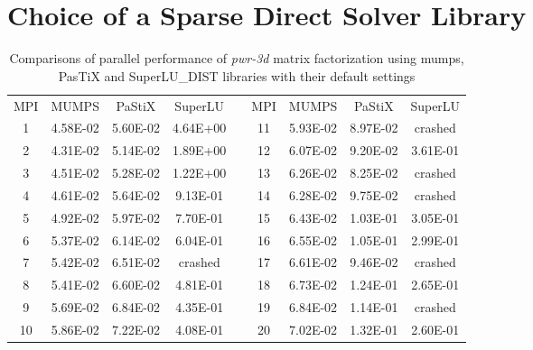 \chapter{Choice of a Sparse Direct Solver Library}
\label{app:app-lc}

\begin{table}[ht]
\centering
\begin{tabular}{|c|c|c|c|l|c|c|c|c|}
\cline{1-4} \cline{6-9}
MPI & MUMPS    & PaStiX   & SuperLU  &  & MPI & MUMPS    & PaStiX   & SuperLU  \\ \cline{1-4} \cline{6-9} 
1   & 4.58E-02 & 5.60E-02 & 4.64E+00 &  & 11  & 5.93E-02 & 8.97E-02 & crashed  \\ \cline{1-4} \cline{6-9} 
2   & 4.31E-02 & 5.14E-02 & 1.89E+00 &  & 12  & 6.07E-02 & 9.20E-02 & 3.61E-01 \\ \cline{1-4} \cline{6-9} 
3   & 4.51E-02 & 5.28E-02 & 1.22E+00 &  & 13  & 6.26E-02 & 8.25E-02 & crashed  \\ \cline{1-4} \cline{6-9} 
4   & 4.61E-02 & 5.64E-02 & 9.13E-01 &  & 14  & 6.28E-02 & 9.75E-02 & crashed  \\ \cline{1-4} \cline{6-9} 
5   & 4.92E-02 & 5.97E-02 & 7.70E-01 &  & 15  & 6.43E-02 & 1.03E-01 & 3.05E-01 \\ \cline{1-4} \cline{6-9} 
6   & 5.37E-02 & 6.14E-02 & 6.04E-01 &  & 16  & 6.55E-02 & 1.05E-01 & 2.99E-01 \\ \cline{1-4} \cline{6-9} 
7   & 5.42E-02 & 6.51E-02 & crashed  &  & 17  & 6.61E-02 & 9.46E-02 & crashed  \\ \cline{1-4} \cline{6-9} 
8   & 5.41E-02 & 6.60E-02 & 4.81E-01 &  & 18  & 6.73E-02 & 1.24E-01 & 2.65E-01 \\ \cline{1-4} \cline{6-9} 
9   & 5.69E-02 & 6.84E-02 & 4.35E-01 &  & 19  & 6.84E-02 & 1.14E-01 & crashed  \\ \cline{1-4} \cline{6-9} 
10  & 5.86E-02 & 7.22E-02 & 4.08E-01 &  & 20  & 7.02E-02 & 1.32E-01 & 2.60E-01 \\ \cline{1-4} \cline{6-9} 
\end{tabular}
\caption{Comparisons of parallel performance of  \textit{pwr-3d} matrix factorization using \acrshort{mumps}, PasTiX and SuperLU\_DIST libraries with their default settings}
\label{table:app-lc-pwr-3d-result}
\end{table}

